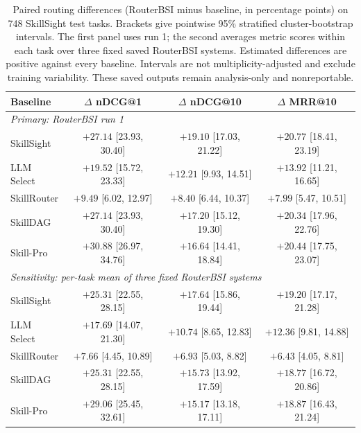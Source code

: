 \begin{table}[t]
\centering
\small
\setlength{\tabcolsep}{3pt}
\begin{tabular*}{\textwidth}{@{\extracolsep{\fill}}lccc@{}}
\toprule
Baseline & $\Delta$ nDCG@1 & $\Delta$ nDCG@10 & $\Delta$ MRR@10 \\
\midrule
\multicolumn{4}{l}{\textit{Primary: RouterBSI run 1}} \\
\midrule
SkillSight & $+27.14$ [23.93, 30.40] & $+19.10$ [17.03, 21.22] & $+20.77$ [18.41, 23.19] \\
LLM Select & $+19.52$ [15.72, 23.33] & $+12.21$ [9.93, 14.51] & $+13.92$ [11.21, 16.65] \\
SkillRouter & $+9.49$ [6.02, 12.97] & $+8.40$ [6.44, 10.37] & $+7.99$ [5.47, 10.51] \\
SkillDAG & $+27.14$ [23.93, 30.40] & $+17.20$ [15.12, 19.30] & $+20.34$ [17.96, 22.76] \\
Skill-Pro & $+30.88$ [26.97, 34.76] & $+16.64$ [14.41, 18.84] & $+20.44$ [17.75, 23.07] \\
\midrule
\multicolumn{4}{l}{\textit{Sensitivity: per-task mean of three fixed RouterBSI systems}} \\
\midrule
SkillSight & $+25.31$ [22.55, 28.15] & $+17.64$ [15.86, 19.44] & $+19.20$ [17.17, 21.28] \\
LLM Select & $+17.69$ [14.07, 21.30] & $+10.74$ [8.65, 12.83] & $+12.36$ [9.81, 14.88] \\
SkillRouter & $+7.66$ [4.45, 10.89] & $+6.93$ [5.03, 8.82] & $+6.43$ [4.05, 8.81] \\
SkillDAG & $+25.31$ [22.55, 28.15] & $+15.73$ [13.92, 17.59] & $+18.77$ [16.72, 20.86] \\
Skill-Pro & $+29.06$ [25.45, 32.61] & $+15.17$ [13.18, 17.11] & $+18.87$ [16.43, 21.24] \\
\bottomrule
\end{tabular*}
\caption{Paired routing differences (RouterBSI minus baseline, in percentage points) on 748 SkillSight test tasks. Brackets give pointwise 95\% stratified cluster-bootstrap intervals. The first panel uses run 1; the second averages metric scores within each task over three fixed saved RouterBSI systems. Estimated differences are positive against every baseline. Intervals are not multiplicity-adjusted and exclude training variability. These saved outputs remain analysis-only and nonreportable.}
\label{tab:paired-routing-uncertainty}
\end{table}
